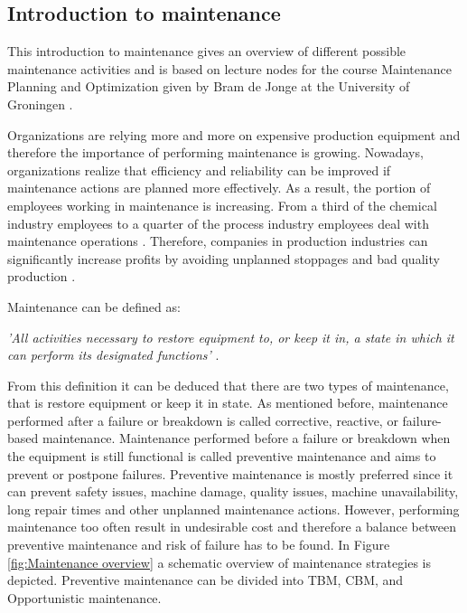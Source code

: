 \subsection{Introduction to maintenance} \label{Introduction to maintenance}
This introduction to maintenance gives an overview of different possible maintenance activities and is based on lecture nodes for the course Maintenance Planning and Optimization given by Bram de Jonge at the University of Groningen \parencite{DeJonge2017}. 

Organizations are relying more and more on expensive production equipment and therefore the importance of performing maintenance is growing. Nowadays, organizations realize that efficiency and reliability can be improved if maintenance actions are planned more effectively. As a result, the portion of employees working in maintenance is increasing. From a third of the chemical industry employees to a quarter of the process industry employees deal with maintenance operations \parencite{WAEYENBERGH2002}. Therefore, companies in production industries can significantly increase profits by avoiding unplanned stoppages and bad quality production \parencite{ALSYOUF200}. 

Maintenance can be defined as:
\begin{center}
\textit{'All activities necessary to restore equipment to, or keep it in, a state in which it can perform its designated functions'} \parencite{DeJonge2017}.
\end{center}
From this definition it can be deduced that there are two types of maintenance, that is restore equipment or keep it in state. As mentioned before, maintenance performed after a failure or breakdown is called corrective, reactive, or failure-based maintenance. Maintenance performed before a failure or breakdown when the equipment is still functional is called preventive maintenance and aims to prevent or postpone failures. Preventive maintenance is mostly preferred since it can prevent safety issues, machine damage, quality issues, machine unavailability, long repair times and other unplanned maintenance actions. However, performing maintenance too often result in undesirable cost and therefore a balance between preventive maintenance and risk of failure has to be found. In Figure \ref{fig:Maintenance overview} a schematic overview of maintenance strategies is depicted. Preventive maintenance can be divided into TBM, CBM, and Opportunistic maintenance. 

